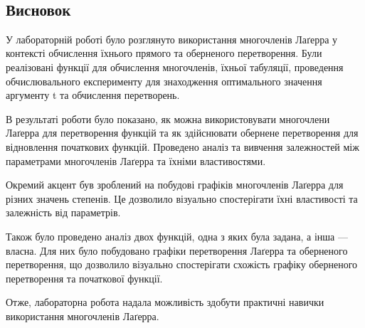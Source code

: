 \documentclass[11pt]{article}
\begin{document}
		\begin{center}
		\end{center}
		{ \hspace*{\fill} \\}
			
			\newpage
			    
			\subsection*{Висновок}\label{ux432ux438ux441ux43dux43eux432ux43eux43a}
			
			У лабораторній роботі було розглянуто використання многочленів Лаґерра у
			контексті обчислення їхнього прямого та оберненого перетворення. Були
			реалізовані функції для обчислення многочленів, їхньої табуляції,
			проведення обчислювального експерименту для знаходження оптимального
			значення аргументу t та обчислення перетворень.
			
			В результаті роботи було показано, як можна використовувати многочлени
			Лаґерра для перетворення функцій та як здійснювати обернене перетворення
			для відновлення початкових функцій. Проведено аналіз та вивчення
			залежностей між параметрами многочленів Лаґерра та їхніми властивостями.
			
			Окремий акцент був зроблений на побудові графіків многочленів Лаґерра
			для різних значень степенів. Це дозволило візуально спостерігати їхні
			властивості та залежність від параметрів.
			
			Також було проведено аналіз двох функцій, одна з яких була задана, а
			інша --- власна. Для них було побудовано графіки перетворення Лаґерра та
			оберненого перетворення, що дозволило візуально спостерігати схожість
			графіку оберненого перетворення та початкової функції.
			
			Отже, лабораторна робота надала можливість здобути практичні навички
			використання многочленів Лаґерра.
			
			
			    
			    
			    
\end{document}
